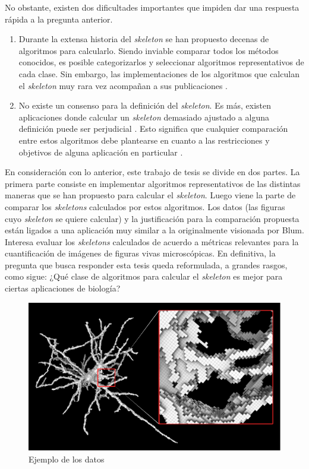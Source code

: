 No obstante, existen dos dificultades importantes que impiden dar una respuesta rápida a la pregunta anterior.

\begin{enumerate}

\item Durante la extensa historia del \textit{skeleton} se han propuesto decenas de algoritmos para calcularlo. Siendo inviable comparar todos los métodos conocidos, es posible categorizarlos y seleccionar algoritmos representativos de cada clase. Sin embargo, las implementaciones de los algoritmos que calculan el \textit{skeleton} muy rara vez acompañan a sus publicaciones \cite{sobiecki2014comparison}.

\item No existe un consenso para la definición del \textit{skeleton}. Es más, existen aplicaciones donde calcular un \textit{skeleton} demasiado ajustado a alguna definición puede ser perjudicial \cite{cornea2007curve}. Esto significa que cualquier comparación entre estos algoritmos debe plantearse en cuanto a las restricciones y objetivos de alguna aplicación en particular \cite{Saha2015}.

\end{enumerate}

En consideración con lo anterior, este trabajo de tesis se divide en dos partes. La primera parte consiste en implementar algoritmos representativos de las distintas maneras que se han propuesto para calcular el \textit{skeleton}. Luego viene la parte de comparar los \textit{skeletons} calculados por estos algoritmos. Los datos (las figuras cuyo \textit{skeleton} se quiere calcular) y la justificación para la comparación propuesta están ligados a una aplicación muy similar a la originalmente visionada por Blum. Interesa evaluar los \textit{skeletons} calculados de acuerdo a métricas relevantes para la cuantificación de imágenes de figuras vivas microscópicas. En definitiva, la pregunta que busca responder esta tesis queda reformulada, a grandes rasgos, como sigue: ¿Qué clase de algoritmos para calcular el \textit{skeleton} es mejor para ciertas aplicaciones de biología?

\begin{figure}[ht]\centering
\includegraphics[width=1\linewidth]{images/neuron_with_closeup}
\caption{Ejemplo de los datos}
\label{neuron_with_closeup}
\end{figure}

